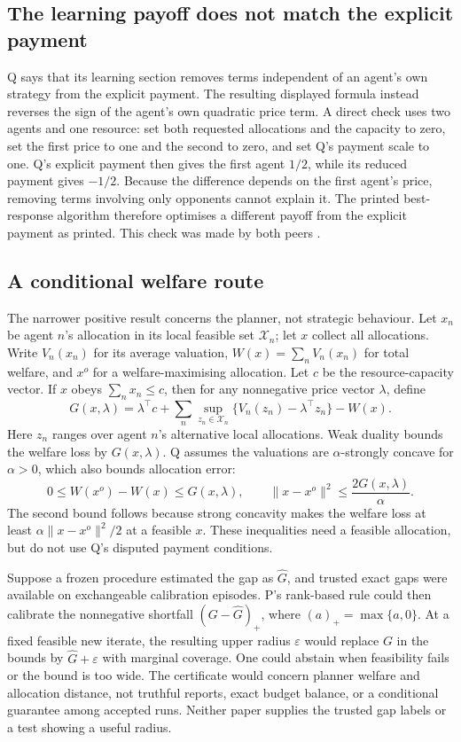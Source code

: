 \documentclass{article}
\begin{document}
\subsection{The learning payoff does not match the explicit payment}

Q says that its learning section removes terms independent of an agent's own strategy from the explicit payment. The
resulting displayed formula instead reverses the sign of the agent's own quadratic price term. A direct check uses
two agents and one resource: set both requested allocations and the capacity to zero, set the first price to one and
the second to zero, and set Q's payment scale to one. Q's explicit payment then gives the first agent \(1/2\), while
its reduced payment gives \(-1/2\). Because the difference depends on the first agent's price, removing terms
involving only opponents cannot explain it. The printed best-response algorithm therefore optimises a different
payoff from the explicit payment as printed. This check was made by both peers \cite{Q}.

\subsection{A conditional welfare route}

The narrower positive result concerns the planner, not strategic behaviour. Let \(x_n\) be agent \(n\)'s allocation
in its local feasible set \(\mathcal X_n\); let \(x\) collect all allocations. Write \(V_n(x_n)\) for its average
valuation, \(W(x)=\sum_n V_n(x_n)\) for total welfare, and \(x^o\) for a welfare-maximising allocation. Let \(c\) be
the resource-capacity vector. If \(x\) obeys \(\sum_n x_n\leq c\), then for any nonnegative price vector \(\lambda\),
define
\[
G(x,\lambda)=\lambda^{\top}c+
\sum_n\sup_{z_n\in\mathcal X_n}
\{V_n(z_n)-\lambda^{\top}z_n\}-W(x).
\]
Here \(z_n\) ranges over agent \(n\)'s alternative local allocations. Weak duality bounds the welfare loss by
\(G(x,\lambda)\). Q assumes the valuations are \(\alpha\)-strongly concave for \(\alpha>0\), which also bounds
allocation error:
\[
0\leq W(x^o)-W(x)\leq G(x,\lambda),
\qquad
\lVert x-x^o\rVert^2\leq \frac{2G(x,\lambda)}{\alpha}.
\]
The second bound follows because strong concavity makes the welfare loss at least \(\alpha\lVert x-x^o\rVert^2/2\) at
a feasible \(x\). These inequalities need a feasible allocation, but do not use Q's disputed payment conditions.

Suppose a frozen procedure estimated the gap as \(\widehat G\), and trusted exact gaps were available on exchangeable
calibration episodes. P's rank-based rule could then calibrate the nonnegative shortfall \((G-\widehat G)_+\), where
\((a)_+=\max\{a,0\}\). At a fixed feasible new iterate, the resulting upper radius \(\varepsilon\) would replace
\(G\) in the bounds by \(\widehat G+\varepsilon\) with marginal coverage. One could abstain when feasibility fails or
the bound is too wide. The certificate would concern planner welfare and allocation distance, not truthful reports,
exact budget balance, or a conditional guarantee among accepted runs. Neither paper supplies the trusted gap labels
or a test showing a useful radius.
\end{document}
